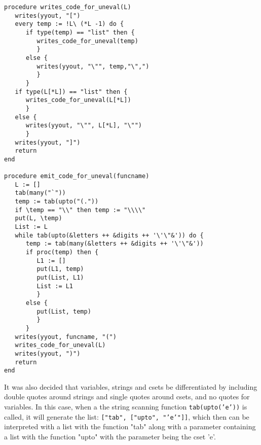 \documentclass{article}
\begin{document}
\begin{verbatim}
procedure writes_code_for_uneval(L)
   writes(yyout, "[")
   every temp := !L\ (*L -1) do {
      if type(temp) == "list" then {
         writes_code_for_uneval(temp)
         } 
      else {
         writes(yyout, "\"", temp,"\",")
         }
      }
   if type(L[*L]) == "list" then {
      writes_code_for_uneval(L[*L])
      }
   else {
      writes(yyout, "\"", L[*L], "\"")
      }
   writes(yyout, "]")
   return
end

procedure emit_code_for_uneval(funcname)
   L := []
   tab(many("`"))
   temp := tab(upto("(.")) 
   if \temp == "\\" then temp := "\\\\"
   put(L, \temp)
   List := L
   while tab(upto(&letters ++ &digits ++ '\'\"&')) do {
      temp := tab(many(&letters ++ &digits ++ '\'\"&'))
      if proc(temp) then {
         L1 := []
         put(L1, temp)
         put(List, L1)
         List := L1
         } 
      else {
         put(List, temp)
         }
      }
   writes(yyout, funcname, "(")
   writes_code_for_uneval(L)
   writes(yyout, ")")
   return
end
\end{verbatim}
It was also decided that variables, strings and csets be differentiated by including double quotes around strings and single quotes around csets, and no quotes for variables.  In this case, when a the string scanning function \texttt{tab(upto('e'))} is called, it will generate the list: \texttt{["tab", ["upto", "'e'"]]}, which then can be interpreted with a list with the function "tab" along with a parameter containing a list with the function "upto" with the parameter being the cset 'e'.
\end{document}

